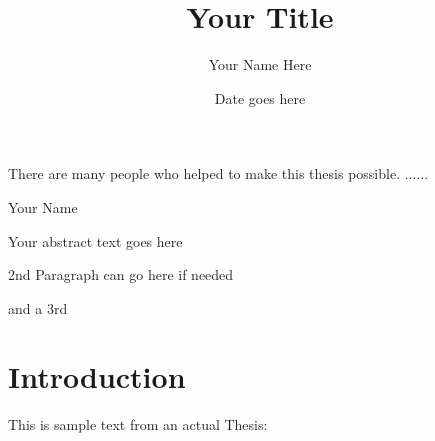 \documentclass[MS, xcolor=dvipsnames]{wfuthesis} %
\begin{document}
\newcommand{\dis}{\displaystyle}
\newcommand{\lt}{\left}
\newcommand{\rt}{\right}
\newcommand{\ra}{\rightarrow}
\newcommand{\cal}{\mathcal}
\newtheorem{thm1}{Theorem}[chapter]
\newtheorem{lem}{Lemma}
\newtheorem{thm}[thm1]{Theorem}
\newtheorem{definition}{Definition}
\newtheorem{cor}{Corollary}
\newcommand{\doublespace}{\addtolength{\baselineskip}{0.6\baselineskip}}
\newcommand{\singlespace}{\addtolength{\baselineskip}{-0.34\baselineskip}}

\title{Your Title}
\author{Your Name Here}

\date{Date goes here}
\maketitle

\clearpage


\acknowledgments  %

There are many people who helped to make this thesis possible. ......

\tableofcontents

\abstract

\noindent Your Name

\vspace{3mm}

\noindent Your abstract text goes here

\vspace{3mm}
\noindent 2nd Paragraph can go here if needed

\vspace{3mm}
\noindent and a 3rd





\chapters

\chapter{Introduction}  %

This is sample text from an actual Thesis:
\end{document}

